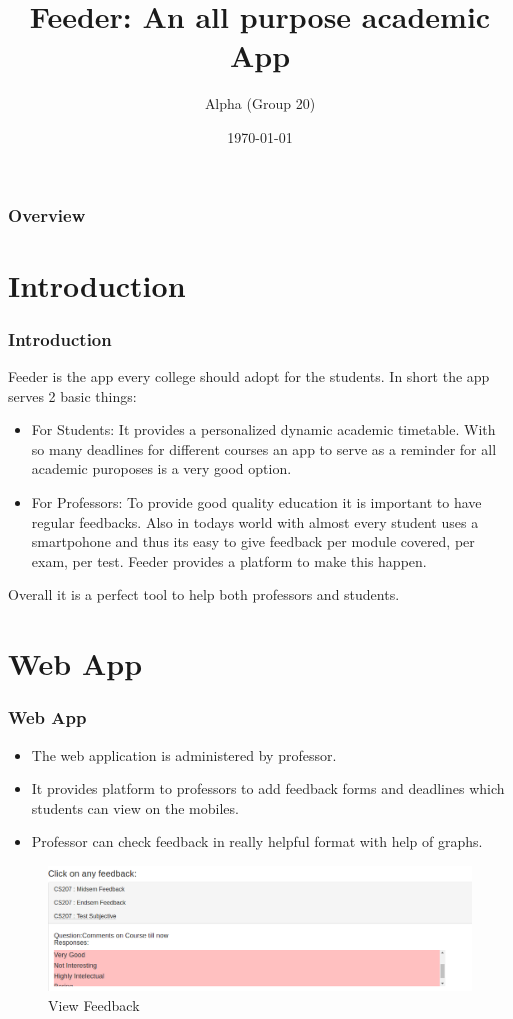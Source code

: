 \documentclass{beamer}
\title[Short title]{Feeder: An all purpose academic App}
\author{Alpha (Group 20)} %
\institute[IIT Bombay]
{
IIT Bombay \\ %
\medskip
}
\date{\today}
\begin{document}
\begin{frame}
\titlepage %
\end{frame}

\begin{frame}
\frametitle{Overview} 
\tableofcontents
\end{frame}


\section{Introduction}

\begin{frame}
\frametitle{Introduction}
Feeder is the app every college should adopt for the students. In short the app serves 2 basic things:
\begin{itemize}
\item For Students: It provides a personalized dynamic academic timetable. With so many deadlines for different courses an app to serve as a reminder for all academic puroposes is a very good option.
\item For Professors: To provide good quality education it is important to have regular feedbacks. Also in todays world with almost every student uses a smartpohone and thus its easy to give feedback per module covered, per exam, per test. Feeder provides a platform to make this happen.
\end{itemize}
Overall it is a perfect tool to help both professors and students.
\end{frame}

\section{Web App}

\begin{frame}
\frametitle{Web App}
\begin{itemize}
\item The web application is administered by professor.
\item It provides platform to professors to add feedback forms and deadlines which students can view on the mobiles.
\item Professor can check feedback in really helpful format with help of graphs.
\end{itemize}
\begin{figure}[ht!]
    \centering
      \includegraphics[width=.4\linewidth]{images/subjectiveAnswers.png}
      \caption{View Feedback\label{overflow}}
  \end{figure}
\end{frame}
\end{document}
